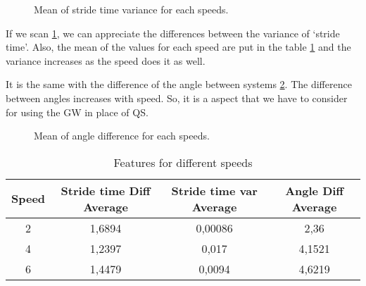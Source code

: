 \begin{figure}[H]
	\centering
	\caption{Mean of stride time variance for each speeds.}
	\label{fig:speed_var_stride_time}
\end{figure}

If we scan \ref{fig:speed_var_stride_time}, we can appreciate the differences between the variance of ‘stride time’. Also, the mean of the values for each speed are put in the table \ref{tab:speeds} and the variance increases as the speed does it as well.

It is the same with the difference of the angle between systems \ref{fig:speed_angle}. The difference between angles increases with speed. So, it is a aspect that we have to consider for using the GW in place of QS.

\begin{figure}[H]
	\centering
	\caption{Mean of angle difference for each speeds.}
	\label{fig:speed_angle}
\end{figure}

\begin{table}[h]
	\caption{Features for different speeds}	
	\centering
	\begin{tabular}{|c|c|c|c|}\hline
		
		Speed & Stride time Diff Average & Stride time var Average & Angle Diff Average	 	\\ \hline
		2  & 1,6894	 & 0,00086 & 2,36 \\
		4 & 1,2397	& 0,017 & 4,1521\\
		6 & 1,4479 & 0,0094	& 4,6219
		\\ \hline
	\end{tabular}
	\label{tab:speeds}
	
\end{table}
